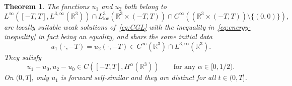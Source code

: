 \documentclass[10pt,a4paper]{amsart}
\newtheorem{theorem}{Theorem}
\begin{document}
\begin{theorem}\label{thm:main}
  The functions \(u_{1}\) and \(u_{2}\) both belong to
  \begin{equation*}
    L^{\infty}([-T, T], L^{3,\infty}(\mathbb{R}^{3}))
    \cap L_{\text{loc}}^{3}(\mathbb{R}^{3} \times (-T, T))
    \cap C^{\infty}((\mathbb{R}^{3} \times (-T, T)) \setminus \{(0, 0)\}),
  \end{equation*}
  are locally suitable weak solutions of~\eqref{eq:CGL} with the
  inequality in~\eqref{eq:energy-inequality} in fact being an
  equality, and share the same initial data
  \begin{equation*}
    u_{1}(\cdot, -T) = u_{2}(\cdot, -T) \in C^{\infty}(\mathbb{R}^{3}) \cap L^{3,\infty}(\mathbb{R}^{3}).
  \end{equation*}
  They satisfy
  \begin{equation*}
    u_{1} - u_{0}, u_{2} - u_{0} \in C([-T, T], H^{\alpha}(\mathbb{R}^{3}))\qquad \text{for any } \alpha \in [0, 1 / 2).
  \end{equation*}
  On \((0, T]\), only \(u_{1}\) is forward self-similar and they are
  distinct for all \(t \in (0, T]\).
\end{theorem}
\end{document}

